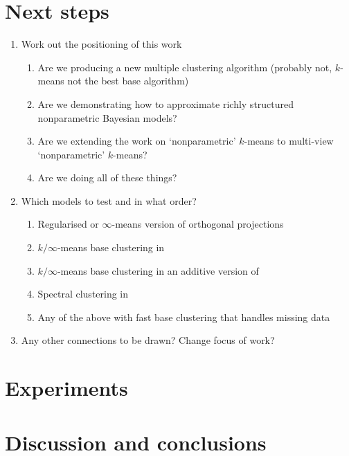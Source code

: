 \documentclass{article}
\numberwithin{equation}{section}
\numberwithin{thm}{section}
\begin{document}
\section{Next steps}

\begin{enumerate}
\item Work out the positioning of this work
\begin{enumerate}
\item Are we producing a new multiple clustering algorithm (probably not, $k$-means not the best base algorithm)
\item Are we demonstrating how to approximate richly structured nonparametric Bayesian models?
\item Are we extending the work on `nonparametric' $k$-means to multi-view `nonparametric' $k$-means?
\item Are we doing all of these things?
\end{enumerate}
\item Which models to test and in what order?
\begin{enumerate}
\item Regularised or $\infty$-means version of orthogonal projections
\item $k/\infty$-means base clustering in \cite{Niu2012}
\item $k/\infty$-means base clustering in an additive version of \cite{Niu2012}
\item Spectral clustering in \cite{Niu2012}
\item Any of the above with fast base clustering that handles missing data
\end{enumerate}
\item Any other connections to be drawn? Change focus of work?
\end{enumerate}

\section{Experiments}

\section{Discussion and conclusions}


\small{

%

}
\end{document}
